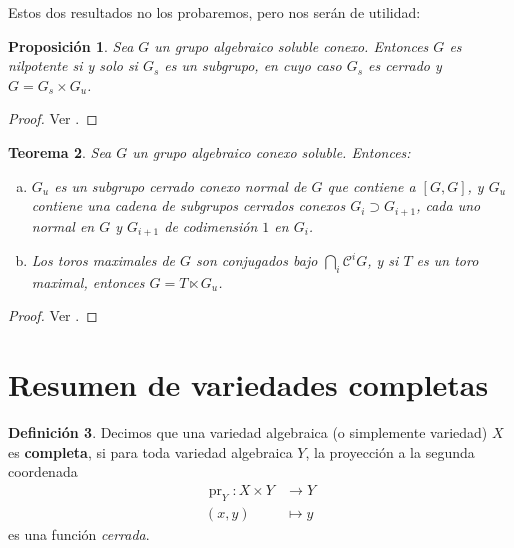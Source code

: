 \documentclass[spanish,10pt]{amsart}
\newtheorem{theorem}{Teorema}[section]
\newtheorem{proposition}[theorem]{Proposición}
\theoremstyle{definition}
\newtheorem{definition}[theorem]{Definición}
\theoremstyle{remark}
\numberwithin{equation}{section}
\begin{document}
Estos dos resultados no los probaremos, pero nos serán de utilidad:

\begin{proposition}\label{proposition:19.2}
Sea $G$ un grupo algebraico soluble conexo. Entonces $G$ es nilpotente si y solo si $G_s$ es un subgrupo, en cuyo caso $G_s$ es cerrado y $G = G_s \times G_u$.
\end{proposition}
\begin{proof}
Ver \cite[\S 19.2.]{humphreys2012linearAlgebraicGroups}.
\end{proof}

\begin{theorem}
Sea $G$ un grupo algebraico conexo soluble. Entonces:
\begin{enumerate}[(a)]
\item $G_u$ es un subgrupo cerrado conexo normal de $G$ que contiene a $[G,G]$, y $G_u$ contiene una cadena de subgrupos cerrados conexos $G_i \supset G_{i+1}$, cada uno normal en $G$ y $G_{i+1}$ de codimensión $1$ en $G_i$.
\item Los toros maximales de $G$ son conjugados bajo $\bigcap_i \mathcal C^i G$, y si $T$ es un toro maximal, entonces $G = T \ltimes G_u$.
\end{enumerate}
\end{theorem}
\begin{proof}
Ver \cite[\S 19.3]{humphreys2012linearAlgebraicGroups}.
\end{proof}






























\section{Resumen de variedades completas}

\begin{definition}
Decimos que una variedad algebraica (o simplemente variedad) $X$ es \textbf{completa}, si para toda variedad algebraica $Y$, la proyección a la segunda coordenada
\begin{align*}
\operatorname{pr}_Y : X \times Y &\longrightarrow Y \\
(x,y) &\longmapsto y
\end{align*}
es una función \textit{cerrada}.
\end{definition}
\end{document}
